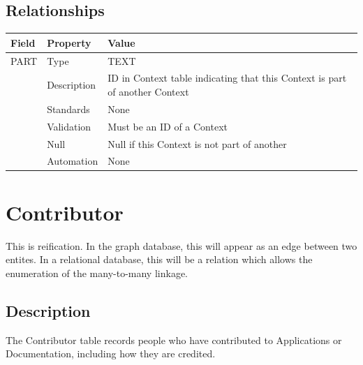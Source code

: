 \subsection{Relationships}\label{relationships-6}

\begin{longtable}[]{@{}
  >{\raggedright\arraybackslash}p{}
  >{\raggedright\arraybackslash}p{}
  >{\raggedright\arraybackslash}p{}@{}}
\toprule\noalign{}
\begin{minipage}[b]{\linewidth}\raggedright
Field
\end{minipage} & \begin{minipage}[b]{\linewidth}\raggedright
Property
\end{minipage} & \begin{minipage}[b]{\linewidth}\raggedright
Value
\end{minipage} \\
\midrule\noalign{}
\endhead
\bottomrule\noalign{}
\endlastfoot
PART & Type & TEXT \\
& Description & ID in Context table indicating that this Context is part
of another Context \\
& Standards & None \\
& Validation & Must be an ID of a Context \\
& Null & Null if this Context is not part of another \\
& Automation & None \\
\end{longtable}

\section{Contributor}\label{contributor}

This is reification. In the graph database, this will appear as an edge
between two entites. In a relational database, this will be a relation
which allows the enumeration of the many-to-many linkage.

\subsection{Description}\label{description-9}

The Contributor table records people who have contributed to
Applications or Documentation, including how they are credited.


